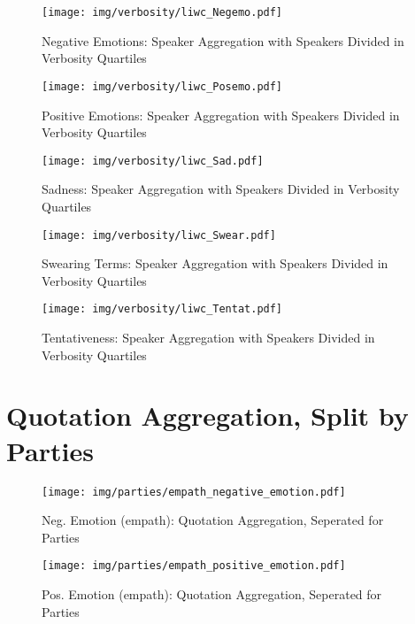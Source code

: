 \begin{figure}[h]\centering
\texttt{[image: img/verbosity/liwc\_Negemo.pdf]}
\caption{Negative Emotions: Speaker Aggregation with Speakers Divided in Verbosity Quartiles}
\label{fig: verbosity_Negative Emotions}
\end{figure}

\begin{figure}[h]\centering
\texttt{[image: img/verbosity/liwc\_Posemo.pdf]}
\caption{Positive Emotions: Speaker Aggregation with Speakers Divided in Verbosity Quartiles}
\label{fig: verbosity_Positive Emotions}
\end{figure}

\begin{figure}[h]\centering
\texttt{[image: img/verbosity/liwc\_Sad.pdf]}
\caption{Sadness: Speaker Aggregation with Speakers Divided in Verbosity Quartiles}
\label{fig: verbosity_Sadness}
\end{figure}

\begin{figure}[h]\centering
\texttt{[image: img/verbosity/liwc\_Swear.pdf]}
\caption{Swearing Terms: Speaker Aggregation with Speakers Divided in Verbosity Quartiles}
\label{fig: verbosity_Swearing Terms}
\end{figure}

\begin{figure}[h]\centering
\texttt{[image: img/verbosity/liwc\_Tentat.pdf]}
\caption{Tentativeness: Speaker Aggregation with Speakers Divided in Verbosity Quartiles}
\label{fig: verbosity_Tentativeness}
\end{figure}

\clearpage
\pagebreak

\section{Quotation Aggregation, Split by Parties}

\begin{figure}[h]\centering
\texttt{[image: img/parties/empath\_negative\_emotion.pdf]}
\caption{Neg. Emotion (empath): Quotation Aggregation, Seperated for Parties}
\label{fig: parties_Neg. Emotion (empath)}
\end{figure}

\begin{figure}[h]\centering
\texttt{[image: img/parties/empath\_positive\_emotion.pdf]}
\caption{Pos. Emotion (empath): Quotation Aggregation, Seperated for Parties}
\label{fig: parties_Pos. Emotion (empath)}
\end{figure}

